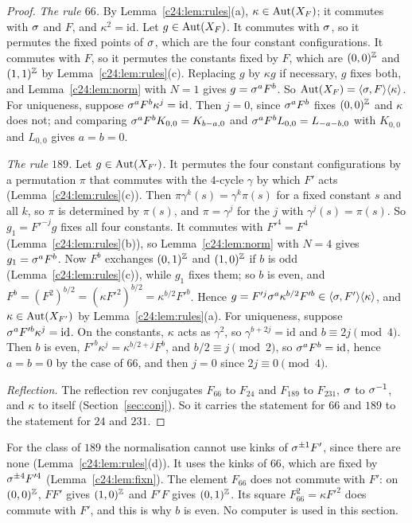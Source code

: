 \begin{proof}
\emph{The rule $66$.} By Lemma~\ref{c24:lem:rules}(a), $\kappa\in\operatorname{Aut}(X_F)$; it commutes with $\sigma$ and $F$, and $\kappa^2=\mathrm{id}$. Let $g\in\operatorname{Aut}(X_F)$. It commutes with $\sigma$, so it permutes the fixed points of $\sigma$, which are the four constant configurations. It commutes with $F$, so it permutes the constants fixed by $F$, which are $(0,0)^{\mathbb{Z}}$ and $(1,1)^{\mathbb{Z}}$ by Lemma~\ref{c24:lem:rules}(c). Replacing $g$ by $\kappa g$ if necessary, $g$ fixes both, and Lemma~\ref{c24:lem:norm} with $N=1$ gives $g=\sigma^aF^b$. So $\operatorname{Aut}(X_F)=\langle\sigma,F\rangle\langle\kappa\rangle$. For uniqueness, suppose $\sigma^aF^b\kappa^j=\mathrm{id}$. Then $j=0$, since $\sigma^aF^b$ fixes $(0,0)^{\mathbb{Z}}$ and $\kappa$ does not; and comparing $\sigma^aF^bK_{0,0}=K_{b-a,0}$ and $\sigma^aF^bL_{0,0}=L_{-a-b,0}$ with $K_{0,0}$ and $L_{0,0}$ gives $a=b=0$.

\emph{The rule $189$.} Let $g\in\operatorname{Aut}(X_{F'})$. It permutes the four constant configurations by a permutation $\pi$ that commutes with the $4$-cycle $\gamma$ by which $F'$ acts (Lemma~\ref{c24:lem:rules}(c)). Then $\pi\gamma^k(s)=\gamma^k\pi(s)$ for a fixed constant $s$ and all $k$, so $\pi$ is determined by $\pi(s)$, and $\pi=\gamma^j$ for the $j$ with $\gamma^j(s)=\pi(s)$. So $g_1=F'^{-j}g$ fixes all four constants. It commutes with $F'^4=F^4$ (Lemma~\ref{c24:lem:rules}(b)), so Lemma~\ref{c24:lem:norm} with $N=4$ gives $g_1=\sigma^aF^b$. Now $F^b$ exchanges $(0,1)^{\mathbb{Z}}$ and $(1,0)^{\mathbb{Z}}$ if $b$ is odd (Lemma~\ref{c24:lem:rules}(c)), while $g_1$ fixes them; so $b$ is even, and $F^b=(F^2)^{b/2}=(\kappa F'^2)^{b/2}=\kappa^{b/2}F'^b$. Hence $g=F'^{j}\sigma^a\kappa^{b/2}F'^b\in\langle\sigma,F'\rangle\langle\kappa\rangle$, and $\kappa\in\operatorname{Aut}(X_{F'})$ by Lemma~\ref{c24:lem:rules}(a). For uniqueness, suppose $\sigma^aF'^b\kappa^j=\mathrm{id}$. On the constants, $\kappa$ acts as $\gamma^2$, so $\gamma^{b+2j}=\mathrm{id}$ and $b\equiv2j\pmod4$. Then $b$ is even, $F'^b\kappa^j=\kappa^{b/2+j}F^b$, and $b/2\equiv j\pmod2$, so $\sigma^aF^b=\mathrm{id}$, hence $a=b=0$ by the case of $66$, and then $j=0$ since $2j\equiv0\pmod4$.

\emph{Reflection.} The reflection $\mathrm{rev}$ conjugates $F_{66}$ to $F_{24}$ and $F_{189}$ to $F_{231}$, $\sigma$ to $\sigma^{-1}$, and $\kappa$ to itself (Section~\ref{sec:conj}). So it carries the statement for $66$ and $189$ to the statement for $24$ and $231$.
\end{proof}

For the class of $189$ the normalisation cannot use kinks of $\sigma^{\pm1}F'$, since there are none (Lemma~\ref{c24:lem:rules}(d)). It uses the kinks of $66$, which are fixed by $\sigma^{\pm4}F'^4$ (Lemma~\ref{c24:lem:fixn}). The element $F_{66}$ does not commute with $F'$: on $(0,0)^{\mathbb{Z}}$, $FF'$ gives $(1,0)^{\mathbb{Z}}$ and $F'F$ gives $(0,1)^{\mathbb{Z}}$. Its square $F_{66}^2=\kappa F'^2$ does commute with $F'$, and this is why $b$ is even. No computer is used in this section.

